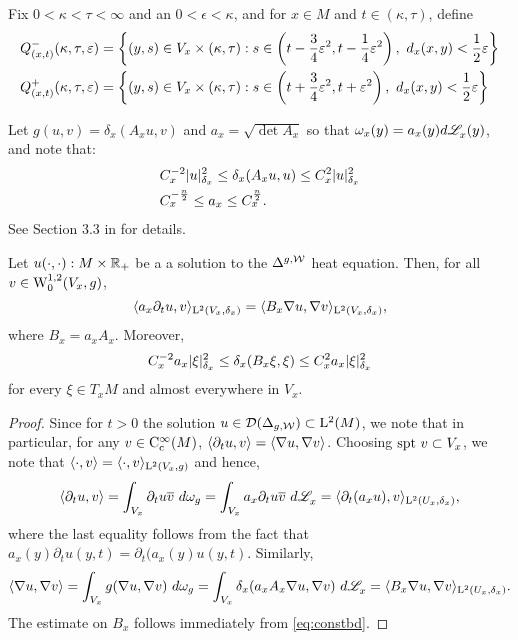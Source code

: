 \documentclass[a4paper, 12pt]{amsart}
\begin{document}
Fix $0 < \kappa < \tau < \infty$ and an $0 < \epsilon < \kappa$,
and for $x \in M$ and $t \in (\kappa, \tau)$, define
\begin{equation}
\label{eq:paradef}
\begin{split} 
Q^-_{(x,t)}(\kappa, \tau, \epsilon) &= \set{(y,s) \in V_x \times (\kappa,\tau): s \in \cbrac{t - \frac{3}{4}\epsilon^2, t - \frac{1}{4} \epsilon^2},\ 
	d_x(x,y) < \frac{1}{2} \epsilon} \\
Q^+_{(x,t)}(\kappa, \tau, \epsilon) &= \set{(y,s) \in V_x \times (\kappa,\tau): s \in \cbrac{t + \frac{3}{4}\epsilon^2, t + \epsilon^2},\ 
	d_x(x,y) < \frac{1}{2} \epsilon}
\end{split}
\end{equation}

Let $g(u,v) = \delta_x(A_x u,v)$
and $a_x = \sqrt{\det A_x}$ so that
$\omega_x(y) = a_x(y)d\Leb_x(y)$, and note
that:
\begin{equation}
\label{eq:constbd}
\begin{split}
&C_x^{-2} \modulus{u}_{\delta_x}^2 \leq \delta_x(A_x u, u) \leq C_x^2 \modulus{u}_{\delta_x}^2 \\
&C_x^{-\frac{n}{2}} \leq a_x \leq C_x^{\frac{n}{2}}.
\end{split}
\end{equation}
See Section 3.3 in \cite{BRough} for details. 

\begin{lemma}
\label{eq:soln1}
Let $u(\cdot, \cdot): M \times \R_+$  be a a solution to the $\Delta^{g,\cW}$ heat equation.
Then, for all $v \in \SobH[0]{1}(V_x,g)$, 
	\begin{equation} 
	\label{eq:testfn1}	 
	\inprod{a_x \partial_t u, v}_{\Lp{2}(V_x, \delta_x)} 
		= \inprod{ B_x \nabla u, \nabla v}_{\Lp{2}(V_x, \delta_x)},
	\end{equation}
where $B_x = a_x A_x$. Moreover,
\begin{equation}
\label{eq:coeff}
C_x^{-2} a_x \modulus{\xi}_{\delta_x}^2 \leq \delta_x(B_x \xi, \xi) 
	\leq C_x^2 a_x \modulus{\xi}_{\delta_x}^2
\end{equation} 
for every $\xi \in T_xM$ and almost everywhere in $V_x$. 
\end{lemma}
\begin{proof}
Since for $t > 0$ the solution $u \in \dom(\Delta_{g,\cW}) \subset \Lp{2}(M)$, we
note that in particular, for any $v \in \Ck[c]{\infty}(M)$, 
$\inprod{\partial_t u, v} = \inprod{\nabla u, \nabla v}$.
Choosing $\spt v \subset V_x$, we note that $\inprod{\cdot, v} = \inprod{\cdot, v}_{\Lp{2}(V_x,g)}$
and hence,
$$\inprod{\partial_t u, v} = \int_{V_x} \partial_t u\conj{v}\ d\omega_g 
	= \int_{V_x} a_x \partial_t  u \conj{v}\ d\Leb_x
	= \inprod{\partial_t (a_x u), v}_{\Lp{2}(U_x, \delta_x)},$$
where the last equality follows from the fact that 
$a_x(y) \partial_t u(y,t) = \partial_t (a_x(y)u(y,t).$
Similarly,
$$\inprod{\nabla u, \nabla v} 
	= \int_{V_x} g(\nabla u, \nabla v)\ d\omega_g
	= \int_{V_x} \delta_x(a_x A_x \nabla u, \nabla v)\ d\Leb_x
	= \inprod{B_x \nabla u, \nabla v}_{\Lp{2}(U_x, \delta_x)}.$$
The estimate on $B_x$ follows immediately from
\eqref{eq:constbd}.
\end{proof} 
\end{document}
